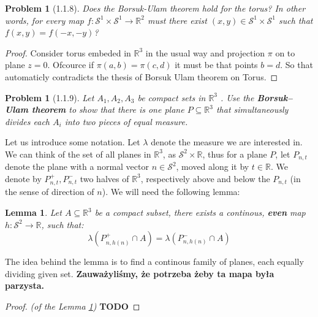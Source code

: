 \documentclass[11pt, a4paper, final]{amsart}
\newcommand{\R}{{\mathbb{R}}}
\newcommand\todo[1]{\textbf{\textcolor{redd}{#1}}}
\newcommand{\sphere}{\mathcal{S}}
\numberwithin{theorem}{section}
\newtheorem{lemma}[theorem]{Lemma}
\newtheorem{problem}[theorem]{Problem}
\theoremstyle{definition}
\theoremstyle{remark}
\begin{document}
\begin{problem}[1.1.8]\label{problem: 1.1.8}
    Does the Borsuk-Ulam theorem hold for the torus? In other words, for every map
    $f: \sphere^1 \times \sphere^1 \to \R^2$ must there exist $(x,y) \in \sphere^1 \times \sphere^1$ such that 
    $f(x,y)= f(-x,-y)$?
\end{problem}

\begin{proof}
    Consider torus embeded in $\R^3$ in the usual way and projection $\pi$ on to plane $z = 0$. 
    Ofcource if $\pi(a,b) = \pi(c,d)$ it must be that points $b = d$.
    So that automaticly contradicts the thesis of Borsuk Ulam theorem on Torus. 
\end{proof}

\begin{problem}[1.1.9]\label{problem: 1.1.9}
    Let $A_1 , A_2 , A_3$ be compact sets in $\R^3$ . Use the \textbf{Borsuk–Ulam theorem} to show
that there is one plane $P \subseteq \R^3$ that simultaneously divides each $A_i$ into two pieces of
equal measure.
\end{problem}

Let us introduce some notation. Let $\lambda$ denote the measure we are interested in. We can think of the set of all planes in $\R^3$, as $\sphere^2\times\R$, thus for a plane $P$, let $P_{n, t}$ denote the plane with a normal vector $n \in \mathcal{S}^2$, moved along it by $t \in \R$. We denote by $P^+_{n, t}, P^-_{n, t}$ two halves of $\R^3$, respectively above and below the $P_{n, t}$ (in the sense of direction of $n$). We will need the following lemma:

\begin{lemma}\label{lemma: about continous equal-cutting}
    Let $A \subseteq \R^3$ be a compact subset, there exists a continous, \textbf{even} map $h : \sphere^2 \xrightarrow{} \R$, such that:
    $$\lambda(P^+_{n, h(n)} \cap A) = \lambda(P^-_{n, h(n)} \cap A)$$
\end{lemma}

The idea behind the lemma is to find a continous family of planes, each equally dividing given set.
\todo{Zauważyliśmy, że potrzeba żeby ta mapa była parzysta.}

\begin{proof}\textit{(of the Lemma \ref{lemma: about continous equal-cutting})}
    \todo{TODO}
\end{proof}
\end{document}
